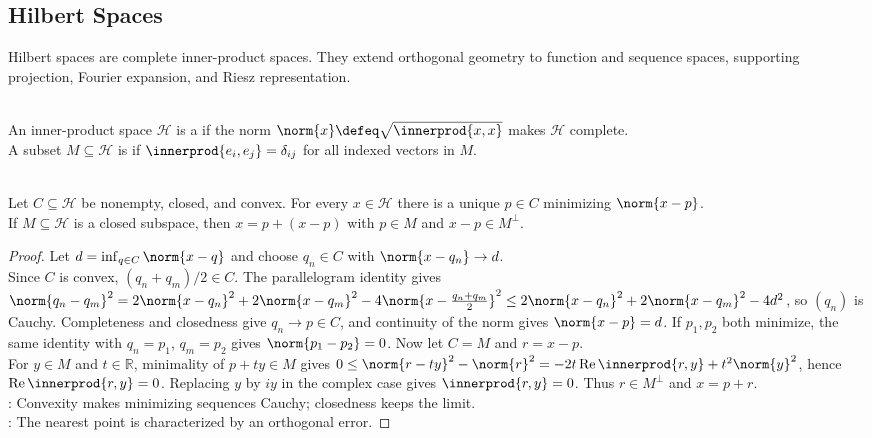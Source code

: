 \subsection{Hilbert Spaces}

%

Hilbert spaces are complete inner-product spaces. They extend orthogonal geometry to function and sequence spaces, supporting projection, Fourier expansion, and Riesz representation.

\begin{definition} \label{def:hilbert-space} \\
An inner-product space $\mathcal{H}$ is a  if the norm $\norm{x}\defeq\sqrt{\innerprod{x,x}}$ makes $\mathcal{H}$ complete.\\
A subset $M\subseteq\mathcal{H}$ is  if $\innerprod{e_i,e_j}=\delta_{ij}$ for all indexed vectors in $M$.
\end{definition}

\begin{theorem} \label{thm:hilbert-projection-theorem} \\
Let $C\subseteq\mathcal{H}$ be nonempty, closed, and convex. For every $x\in\mathcal{H}$ there is a unique $p\in C$ minimizing $\norm{x-p}$.\\
If $M\subseteq\mathcal{H}$ is a closed subspace, then $x=p+(x-p)$ with $p\in M$ and $x-p\in M^\perp$.
\begin{proof}
Let $d=\inf_{q\in C}\norm{x-q}$ and choose $q_n\in C$ with $\norm{x-q_n}\to d$.\\
Since $C$ is convex, $(q_n+q_m)/2\in C$. The parallelogram identity gives\\
$\norm{q_n-q_m}^2 =2\norm{x-q_n}^2+2\norm{x-q_m}^2-4\norm{x-\frac{q_n+q_m}{2}}^2 \leq2\norm{x-q_n}^2+2\norm{x-q_m}^2-4d^2$, so $(q_n)$ is Cauchy. Completeness and closedness give $q_n\to p\in C$, and continuity of the norm gives $\norm{x-p}=d$. If $p_1,p_2$ both minimize, the same identity with $q_n=p_1$, $q_m=p_2$ gives $\norm{p_1-p_2}=0$. Now let $C=M$ and $r=x-p$.\\
For $y\in M$ and $t\in\mathbb{R}$, minimality of $p+ty\in M$ gives $0\leq\norm{r-ty}^2-\norm{r}^2=-2t\operatorname{Re}\innerprod{r,y}+t^2\norm{y}^2$, hence $\operatorname{Re}\innerprod{r,y}=0$. Replacing $y$ by $iy$ in the complex case gives $\innerprod{r,y}=0$. Thus $r\in M^\perp$ and $x=p+r$.\\
: Convexity makes minimizing sequences Cauchy; closedness keeps the limit.\\
: The nearest point is characterized by an orthogonal error.
\end{proof}
\end{theorem}

